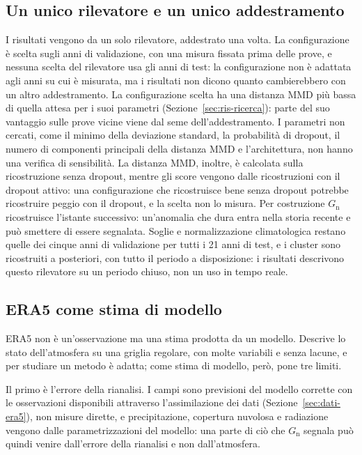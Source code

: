 \subsection{Un unico rilevatore e un unico addestramento}
I risultati vengono da un solo rilevatore, addestrato una volta. La configurazione è scelta sugli anni di validazione, con una misura fissata prima delle prove, e nessuna scelta del rilevatore usa gli anni di test: la configurazione non è adattata agli anni su cui è misurata, ma i risultati non dicono quanto cambierebbero con un altro addestramento. La configurazione scelta ha una distanza MMD più bassa di quella attesa per i suoi parametri (Sezione~\ref{sec:ris-ricerca}): parte del suo vantaggio sulle prove vicine viene dal seme dell'addestramento. I parametri non cercati, come il minimo della deviazione standard, la probabilità di dropout, il numero di componenti principali della distanza MMD e l'architettura, non hanno una verifica di sensibilità. La distanza MMD, inoltre, è calcolata sulla ricostruzione senza dropout, mentre gli score vengono dalle ricostruzioni con il dropout attivo: una configurazione che ricostruisce bene senza dropout potrebbe ricostruire peggio con il dropout, e la scelta non lo misura. Per costruzione $G_{\mathrm{n}}$ ricostruisce l'istante successivo: un'anomalia che dura entra nella storia recente e può smettere di essere segnalata. Soglie e normalizzazione climatologica restano quelle dei cinque anni di validazione per tutti i 21 anni di test, e i cluster sono ricostruiti a posteriori, con tutto il periodo a disposizione: i risultati descrivono questo rilevatore su un periodo chiuso, non un uso in tempo reale.

\subsection{ERA5 come stima di modello}
ERA5 non è un'osservazione ma una stima prodotta da un modello. Descrive lo stato dell'atmosfera su una griglia regolare, con molte variabili e senza lacune, e per studiare un metodo è adatta; come stima di modello, però, pone tre limiti.

Il primo è l'errore della rianalisi. I campi sono previsioni del modello corrette con le osservazioni disponibili attraverso l'assimilazione dei dati (Sezione~\ref{sec:dati-era5}), non misure dirette, e precipitazione, copertura nuvolosa e radiazione vengono dalle parametrizzazioni del modello: una parte di ciò che $G_{\mathrm{n}}$ segnala può quindi venire dall'errore della rianalisi e non dall'atmosfera.

